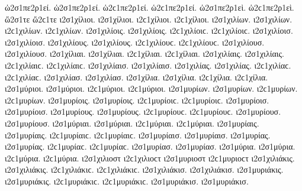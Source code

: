 {ὡ2σ1πε2ρ1εί. ὡ2σ1πε2ρ1εί. ὡ2ϲ1πε2ρ1εί. ὡ2ϲ1πε2ρ1εί.   %
ὡ2σ1πε2ρ1εὶ. ὡ2ϲ1πε2ρ1εὶ. 
ὥ2σ1τε ὥ2ϲ1τε   %
ι2σ1χίλιοι. ι2σ1χίλιοι. ι2ϲ1χίλιοι. ι2ϲ1χίλιοι.   %
ι2σ1χιλίων. ι2σ1χιλίων. ι2ϲ1χιλίων. ι2ϲ1χιλίων. 
ι2σ1χιλίοις. ι2σ1χιλίοις. ι2ϲ1χιλίοιϲ. ι2ϲ1χιλίοιϲ. 
ι2σ1χιλίοισ. ι2σ1χιλίοισ. 
ι2σ1χιλίους. ι2σ1χιλίους. ι2ϲ1χιλίουϲ. ι2ϲ1χιλίουϲ. 
ι2σ1χιλίουσ. ι2σ1χιλίουσ. 
ι2σ1χίλιαι. ι2σ1χίλιαι. ι2ϲ1χίλιαι. ι2ϲ1χίλιαι. 
ι2σ1χιλίαις. ι2σ1χιλίαις. ι2ϲ1χιλίαιϲ. ι2ϲ1χιλίαιϲ. 
ι2σ1χιλίαισ. ι2σ1χιλίαισ. 
ι2σ1χιλίας. ι2σ1χιλίας. ι2ϲ1χιλίαϲ. ι2ϲ1χιλίαϲ. 
ι2σ1χιλίασ. ι2σ1χιλίασ. 
ι2σ1χίλια. ι2σ1χίλια. ι2ϲ1χίλια. ι2ϲ1χίλια. 
%
ι2σ1μύριοι. ι2σ1μύριοι. ι2ϲ1μύριοι. ι2ϲ1μύριοι.   %
ι2σ1μυρίων. ι2σ1μυρίων. ι2ϲ1μυρίων. ι2ϲ1μυρίων. 
ι2σ1μυρίοις. ι2σ1μυρίοις. ι2ϲ1μυρίοιϲ. ι2ϲ1μυρίοιϲ. 
ι2σ1μυρίοισ. ι2σ1μυρίοισ. 
ι2σ1μυρίους. ι2σ1μυρίους. ι2ϲ1μυρίουϲ. ι2ϲ1μυρίουϲ. 
ι2σ1μυρίουσ. ι2σ1μυρίουσ. 
ι2σ1μύριαι. ι2σ1μύριαι. ι2ϲ1μύριαι. ι2ϲ1μύριαι. 
ι2σ1μυρίαις. ι2σ1μυρίαις. ι2ϲ1μυρίαιϲ. ι2ϲ1μυρίαιϲ. 
ι2σ1μυρίαισ. ι2σ1μυρίαισ. 
ι2σ1μυρίας. ι2σ1μυρίας. ι2ϲ1μυρίαϲ. ι2ϲ1μυρίαϲ. 
ι2σ1μυρίασ. ι2σ1μυρίασ. 
ι2σ1μύρια. ι2σ1μύρια. ι2ϲ1μύρια. ι2ϲ1μύρια. 
%
ι2σ1χιλιοστ ι2ϲ1χιλιοϲτ   %
%
ι2σ1μυριοστ ι2ϲ1μυριοϲτ   %
%
ι2σ1χιλιάκις. ι2σ1χιλιάκις. ι2ϲ1χιλιάκιϲ. ι2ϲ1χιλιάκιϲ.   %
ι2σ1χιλιάκισ. ι2σ1χιλιάκισ. 
%
ι2σ1μυριάκις. ι2σ1μυριάκις. ι2ϲ1μυριάκιϲ. ι2ϲ1μυριάκιϲ.   %
ι2σ1μυριάκισ. ι2σ1μυριάκισ. 
}
\endgroup
\endinput
